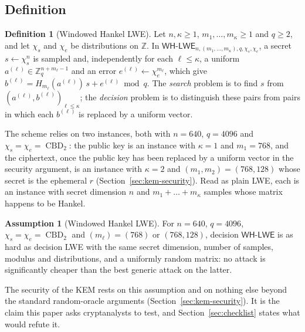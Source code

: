 \documentclass[11pt,a4paper]{article}
\theoremstyle{definition}
\newtheorem{definition}{Definition}
\newtheorem{assumption}{Assumption}
\newcommand{\Z}{\mathbb{Z}}
\newcommand{\Zq}{\mathbb{Z}_q}
\newcommand{\CBD}{\operatorname{CBD}}
\newcommand{\WHLWE}{\textsf{WH-LWE}}
\begin{document}
\subsection{Definition}
\begin{definition}[Windowed Hankel LWE]\label{def:whlwe}
Let $n, \kappa \ge 1$, $m_1, \dots, m_\kappa \ge 1$ and $q \ge 2$, and let $\chi_s$ and $\chi_e$ be distributions on $\Z$. In $\WHLWE_{n,(m_1,\dots,m_\kappa),q,\chi_s,\chi_e}$, a secret $s \gets \chi_s^n$ is sampled and, independently for each $\ell \le \kappa$, a uniform $a^{(\ell)} \in \Zq^{n + m_\ell - 1}$ and an error $e^{(\ell)} \gets \chi_e^{m_\ell}$, which give $b^{(\ell)} = H_{m_\ell}(a^{(\ell)})\, s + e^{(\ell)} \bmod q$. The \emph{search} problem is to find $s$ from $(a^{(\ell)}, b^{(\ell)})_{\ell \le \kappa}$; the \emph{decision} problem is to distinguish these pairs from pairs in which each $b^{(\ell)}$ is replaced by a uniform vector.
\end{definition}

The scheme relies on two instances, both with $n = 640$, $q = 4096$ and $\chi_s = \chi_e = \CBD_2$: the public key is an instance with $\kappa = 1$ and $m_1 = 768$, and the ciphertext, once the public key has been replaced by a uniform vector in the security argument, is an instance with $\kappa = 2$ and $(m_1, m_2) = (768, 128)$ whose secret is the ephemeral $r$ (Section~\ref{sec:kem-security}). Read as plain LWE, each is an instance with secret dimension $n$ and $m_1 + \dots + m_\kappa$ samples whose matrix happens to be Hankel.

\begin{assumption}[Windowed Hankel LWE]\label{ass:whlwe}
For $n = 640$, $q = 4096$, $\chi_s = \chi_e = \CBD_2$ and $(m_\ell) = (768)$ or $(768, 128)$, decision $\WHLWE$ is as hard as decision LWE with the same secret dimension, number of samples, modulus and distributions, and a uniformly random matrix: no attack is significantly cheaper than the best generic attack on the latter.
\end{assumption}

The security of the KEM rests on this assumption and on nothing else beyond the standard random-oracle arguments (Section~\ref{sec:kem-security}). It is the claim this paper asks cryptanalysts to test, and Section~\ref{sec:checklist} states what would refute it.
\end{document}

